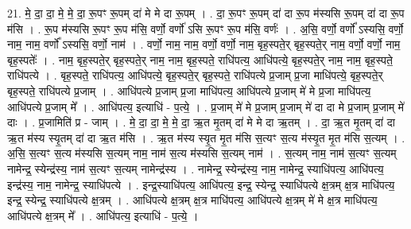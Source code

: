 \documentclass[17pt]{extarticle}
\begin{document}
21. मे॒ दा॒ दा॒ मे॒ मे॒ दा॒ रू॒पꣳ रू॒पम् दा॑ मे मे दा रू॒पम् । . दा॒ रू॒पꣳ रू॒पम् दा॑ दा रू॒प म॑स्यसि रू॒पम् दा॑ दा रू॒प म॑सि । . रू॒प म॑स्यसि रू॒पꣳ रू॒प म॑सि॒ वर्णो॒ वर्णो॑ ऽसि रू॒पꣳ रू॒प म॑सि॒ वर्णः॑ । . अ॒सि॒ वर्णो॒ वर्णो᳚ ऽस्यसि॒ वर्णो॒ नाम॒ नाम॒ वर्णो᳚ ऽस्यसि॒ वर्णो॒ नाम॑ । . वर्णो॒ नाम॒ नाम॒ वर्णो॒ वर्णो॒ नाम॒ बृह॒स्पते॒र् बृह॒स्पते॒र् नाम॒ वर्णो॒ वर्णो॒ नाम॒ बृह॒स्पतेः᳚ । . नाम॒ बृह॒स्पते॒र् बृह॒स्पते॒र् नाम॒ नाम॒ बृह॒स्पते॒ राधि॑पत्य॒ आधि॑पत्ये॒ बृह॒स्पते॒र् नाम॒ नाम॒ बृह॒स्पते॒ राधि॑पत्ये । . बृह॒स्पते॒ राधि॑पत्य॒ आधि॑पत्ये॒ बृह॒स्पते॒र् बृह॒स्पते॒ राधि॑पत्ये प्र॒जाम् प्र॒जा माधि॑पत्ये॒ बृह॒स्पते॒र् बृह॒स्पते॒ राधि॑पत्ये प्र॒जाम् । . आधि॑पत्ये प्र॒जाम् प्र॒जा माधि॑पत्य॒ आधि॑पत्ये प्र॒जाम् मे॑ मे प्र॒जा माधि॑पत्य॒ आधि॑पत्ये प्र॒जाम् मे᳚ । . आधि॑पत्य॒ इत्याधि॑ - प॒त्ये॒ । . प्र॒जाम् मे॑ मे प्र॒जाम् प्र॒जाम् मे॑ दा दा मे प्र॒जाम् प्र॒जाम् मे॑ दाः । . प्र॒जामिति॑ प्र - जाम् । . मे॒ दा॒ दा॒ मे॒ मे॒ दा॒ ऋ॒त मृ॒तम् दा॑ मे मे दा ऋ॒तम् । . दा॒ ऋ॒त मृ॒तम् दा॑ दा ऋ॒त म॑स्य स्यृ॒तम् दा॑ दा ऋ॒त म॑सि । . ऋ॒त म॑स्य स्यृ॒त मृ॒त म॑सि स॒त्यꣳ स॒त्य म॑स्यृ॒त मृ॒त म॑सि स॒त्यम् । . अ॒सि॒ स॒त्यꣳ स॒त्य म॑स्यसि स॒त्यम् नाम॒ नाम॑ स॒त्य म॑स्यसि स॒त्यम् नाम॑ । . स॒त्यम् नाम॒ नाम॑ स॒त्यꣳ स॒त्यम् नामेन्द्र॒ स्येन्द्र॑स्य॒ नाम॑ स॒त्यꣳ स॒त्यम् नामेन्द्र॑स्य । . नामेन्द्र॒ स्येन्द्र॑स्य॒ नाम॒ नामेन्द्र॒ स्याधि॑पत्य॒ आधि॑पत्य॒ इन्द्र॑स्य॒ नाम॒ नामेन्द्र॒ स्याधि॑पत्ये । . इन्द्र॒स्याधि॑पत्य॒ आधि॑पत्य॒ इन्द्र॒ स्येन्द्र॒ स्याधि॑पत्ये क्ष॒त्रम् क्ष॒त्र माधि॑पत्य॒ 
इन्द्र॒ स्येन्द्र॒ स्याधि॑पत्ये क्ष॒त्रम् । . आधि॑पत्ये क्ष॒त्रम् क्ष॒त्र माधि॑पत्य॒ आधि॑पत्ये क्ष॒त्रम् मे॑ मे क्ष॒त्र माधि॑पत्य॒ आधि॑पत्ये क्ष॒त्रम् मे᳚ । . आधि॑पत्य॒ इत्याधि॑ - प॒त्ये॒ । \newline
\end{document}
